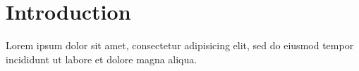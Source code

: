 \section{Introduction}
\label{sec:intro}
Lorem ipsum dolor sit amet, consectetur adipisicing elit, sed do eiusmod
tempor incididunt ut labore et dolore magna aliqua. 




